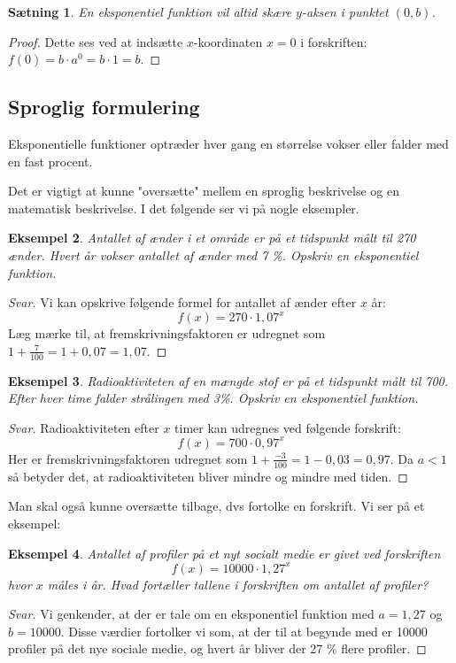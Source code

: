 \documentclass[12pt,oneside,a4paper]{article}
\newtheorem{thm}{Sætning}[section]
\newtheorem{eks}[thm]{Eksempel}
\begin{document}
\begin{thm}
    En eksponentiel funktion vil altid skære $y$-aksen i punktet $(0,b)$.
\end{thm}
\begin{proof}
    Dette ses ved at indsætte $x$-koordinaten $x=0$ i forskriften:
    $f(0) = b\cdot a^0 = b\cdot 1 = b$.
\end{proof}

\subsection{Sproglig formulering}
Eksponentielle funktioner optræder hver gang en størrelse vokser eller falder
med en fast procent.

Det er vigtigt at kunne "oversætte" mellem en sproglig beskrivelse og en matematisk beskrivelse.
I det følgende ser vi på nogle eksempler.

\begin{eks}
    Antallet af ænder i et område er på et tidspunkt målt til 270 ænder. Hvert
    år vokser antallet af ænder med 7 \%. Opskriv en eksponentiel funktion.
\end{eks}
\begin{proof}[Svar]
    Vi kan opskrive følgende formel for antallet af ænder efter $x$ år:
    $$
    f(x) = 270 \cdot 1,07^x
    $$
    Læg mærke til, at fremskrivningsfaktoren er udregnet som $1+\frac{7}{100} =
    1+0,07 = 1,07$.
\end{proof}

\begin{eks}
    Radioaktiviteten af en mængde stof er på et tidspunkt målt til 700. Efter
    hver time falder strålingen med 3\%. Opskriv en eksponentiel funktion.
\end{eks}
\begin{proof}[Svar]
    Radioaktiviteten efter $x$ timer kan udregnes ved følgende forskrift:
    $$
    f(x) = 700 \cdot 0,97^x
    $$
    Her er fremskrivningsfaktoren udregnet som $1 + \frac{-3}{100} = 1-0,03 = 0,97$.
    Da $a<1$ så betyder det, at radioaktiviteten bliver mindre og mindre med tiden.
\end{proof}

Man skal også kunne oversætte tilbage, dvs fortolke en forskrift. Vi ser på et eksempel:

\begin{eks}
    Antallet af profiler på et nyt socialt medie er givet ved forskriften
    $$
    f(x) = 10000 \cdot 1,27^x
    $$
    hvor $x$ måles i år. Hvad fortæller tallene i forskriften om antallet af
    profiler?
\end{eks}
\begin{proof}[Svar]
    Vi genkender, at der er tale om en eksponentiel funktion med $a=1,27$ og
    $b=10000$.  Disse værdier fortolker vi som, at der til at begynde med er
    10000 profiler på det nye sociale medie, og hvert år bliver der 27 \% flere
    profiler.
\end{proof}
\end{document}
